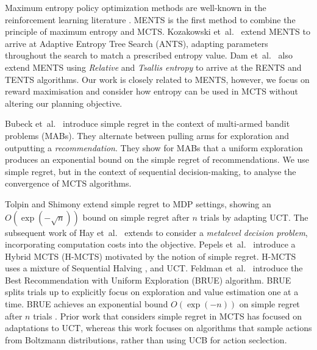 \documentclass{article}
\newcommand{\etal}{et~al.\ }
\theoremstyle{plain}
\begin{document}
    Maximum entropy policy optimization methods are well-known in the reinforcement learning literature  \cite{haarnoja2017reinforcement, haarnoja2018soft, ziebart2008maximum}. 
    MENTS \cite{xiao2019maximum} is the first method to combine the principle of maximum entropy and MCTS. Kozakowski \etal \cite{ants} extend MENTS to arrive at Adaptive Entropy Tree Search (ANTS), 
    adapting parameters throughout the search to match a prescribed entropy value. Dam \etal \cite{rents_your_tents} also extend MENTS using \textit{Relative} and \textit{Tsallis entropy} to arrive at the RENTS and TENTS algorithms. 
    Our work is closely related to MENTS, however, we focus on reward maximisation and consider how entropy can be used in MCTS without altering our planning objective.
    
    Bubeck \etal \cite{simple_regret_short, simple_regret_long} introduce %
    simple regret in the context of multi-armed bandit problems (MABs). They alternate between pulling arms for exploration and outputting a \textit{recommendation}. They show for MABs that a uniform exploration produces an exponential bound on the simple regret of recommendations. 
    We use simple regret, but in the context of sequential decision-making, to analyse the convergence of MCTS algorithms.
    
    Tolpin and Shimony \cite{mcts_simple_regret} extend simple regret to MDP settings, showing an $O(\exp(-\sqrt{n}))$ bound on simple regret after $n$ trials by adapting UCT. The subsequent work of Hay \etal \cite{hay2014selecting} extends \cite{mcts_simple_regret} to consider a \textit{metalevel decision problem}, incorporating computation costs into the objective. Pepels \etal \cite{mcts_simple_regret_two} introduce a Hybrid MCTS (H-MCTS) motivated by the notion of simple regret. H-MCTS uses a mixture of Sequential Halving \cite{karnin2013almost}, and UCT. Feldman \etal \cite{brue1,brue2,brue3} introduce the Best Recommendation with Uniform Exploration (BRUE) algorithm. BRUE splits trials up to explicitly focus on exploration and value estimation one at a time. BRUE achieves an exponential bound $O(\exp(-n))$ on simple regret after $n$ trials \cite{brue1}. 
    Prior work that considers simple regret in MCTS has focused on adaptations to UCT, whereas this work focuses on algorithms that sample actions from Boltzmann distributions, rather than using UCB for action seclection.
\end{document}
